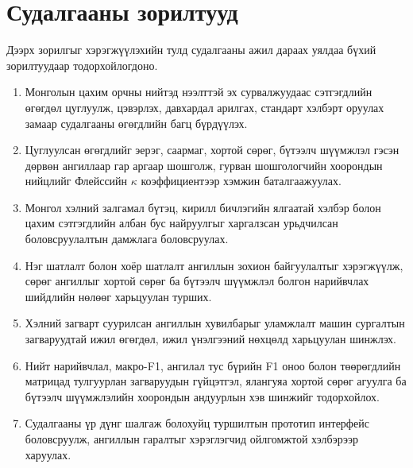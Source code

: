 \section{Судалгааны зорилтууд}

Дээрх зорилгыг хэрэгжүүлэхийн тулд судалгааны ажил дараах уялдаа бүхий
зорилтуудаар тодорхойлогдоно.

\begin{enumerate}
  \item Монголын цахим орчны нийтэд нээлттэй эх сурвалжуудаас сэтгэгдлийн
        өгөгдөл цуглуулж, цэвэрлэх, давхардал арилгах, стандарт хэлбэрт
        оруулах замаар судалгааны өгөгдлийн багц бүрдүүлэх.

  \item Цуглуулсан өгөгдлийг эерэг, саармаг, хортой сөрөг, бүтээлч шүүмжлэл
        гэсэн дөрвөн ангиллаар гар аргаар шошголж, гурван шошгологчийн
        хоорондын нийцлийг Флейссийн $\kappa$ коэффициентээр хэмжин баталгаажуулах.

  \item Монгол хэлний залгамал бүтэц, кирилл бичлэгийн ялгаатай хэлбэр болон
        цахим сэтгэгдлийн албан бус найруулгыг харгалзсан урьдчилсан
        боловсруулалтын дамжлага боловсруулах.

  \item Нэг шатлалт болон хоёр шатлалт ангиллын зохион байгуулалтыг хэрэгжүүлж,
        сөрөг ангиллыг хортой сөрөг ба бүтээлч шүүмжлэл болгон нарийвчлах
        шийдлийн нөлөөг харьцуулан турших.

  \item Хэлний загварт суурилсан ангиллын хувилбарыг уламжлалт машин сургалтын
        загваруудтай ижил өгөгдөл, ижил үнэлгээний нөхцөлд харьцуулан шинжлэх.

  \item Нийт нарийвчлал, макро-F1, ангилал тус бүрийн F1 оноо болон төөрөгдлийн
        матрицад тулгуурлан загваруудын гүйцэтгэл, ялангуяа хортой сөрөг
        агуулга ба бүтээлч шүүмжлэлийн хоорондын андуурлын хэв шинжийг
        тодорхойлох.

  \item Судалгааны үр дүнг шалгаж болохуйц туршилтын прототип интерфейс
        боловсруулж, ангиллын гаралтыг хэрэглэгчид ойлгомжтой хэлбэрээр харуулах.
\end{enumerate}

